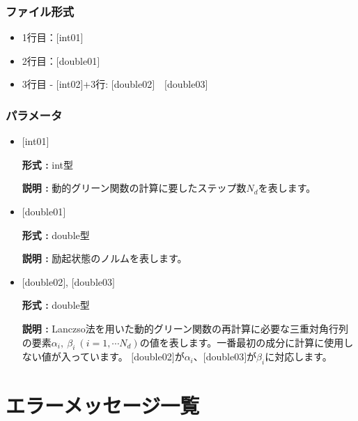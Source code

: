 \subsubsection{ファイル形式}
 \begin{itemize}
   \item  1行目：$[$int01$]$
   \item  2行目：$[$double01$]$
   \item  3行目 - $[$int02$]$+3行: $[$double02$]$~~$[$double03$]$
  \end{itemize}
\subsubsection{パラメータ}
 \begin{itemize}

  \item  $[$int01$]$

 {\bf 形式 :} int型

 {\bf 説明 :} 動的グリーン関数の計算に要したステップ数$N_d$を表します。

  \item  $[$double01$]$

 {\bf 形式 :} double型

{\bf 説明 :} 励起状態のノルムを表します。

 
 \item  $[$double02$]$, $[$double03$]$

 {\bf 形式 :} double型 

{\bf 説明 :} Lanczso法を用いた動的グリーン関数の再計算に必要な三重対角行列の要素$\alpha_i,~\beta_i~(i =1,\cdots N_d)$の値を表します。一番最初の成分に計算に使用しない値が入っています。
$[$double02$]$が$\alpha_i$、$[$double03$]$が$\beta_i$に対応します。\\
\end{itemize}

\newpage
\section{エラーメッセージ一覧}

